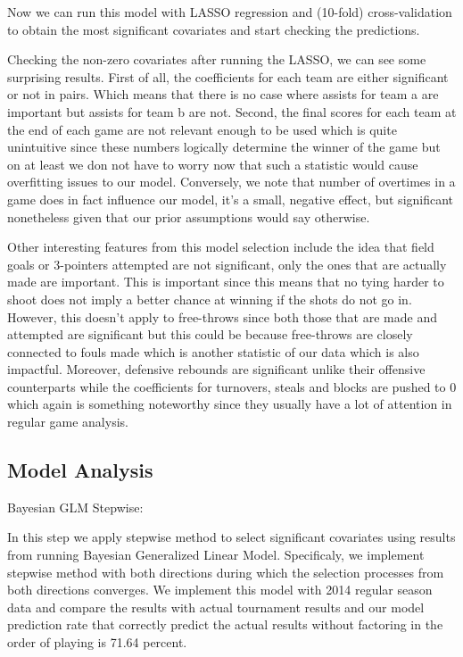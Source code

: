 \documentclass{article} %
\begin{document}
Now we can run this model with LASSO regression and (10-fold) cross-validation to obtain the most significant covariates and start checking the predictions.\

Checking the non-zero covariates after running the LASSO, we can see some surprising results. 
First of all, the coefficients for each team are either significant or not in pairs. Which means that there is no case where assists for team a are important but assists for team b are not. Second, the final scores for each team at the end of each game are not relevant enough to be used which is quite unintuitive since these numbers logically determine the winner of the game but on at least we don not have to worry now that such a statistic would cause overfitting issues to our model. Conversely, we note that number of overtimes in a game does in fact influence our model, it's a small, negative effect, but significant nonetheless given that our prior assumptions would say otherwise. \

Other interesting features from this model selection include the idea that field goals or 3-pointers attempted are not significant, only the ones that are actually made are important. This is important since this means that no tying harder to shoot does not imply a better chance at winning if the shots do not go in. However, this doesn't apply to free-throws since both those that are made and attempted are significant but this could be because free-throws are closely connected to fouls made which is another statistic of our data which is also impactful. Moreover, defensive rebounds are significant unlike their offensive counterparts while the coefficients for turnovers, steals and blocks are pushed to 0 which again is something noteworthy since they usually have a lot of attention in regular game analysis.\

\subsection{Model Analysis}

Bayesian GLM Stepwise:

In this step we apply stepwise method to select significant covariates using results from running Bayesian Generalized Linear Model. Specificaly, we implement stepwise method with both directions during which the selection processes from both directions converges. We implement this model with 2014 regular season data and compare the results with actual tournament results and our model prediction rate that correctly predict the actual results without factoring in the order of playing is 71.64 percent.\
\end{document}
